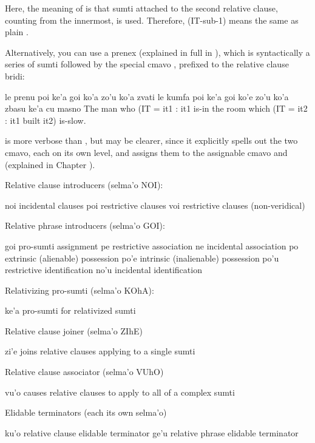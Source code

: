 Here, the meaning of  is that sumti attached to the
    second relative clause, counting from the innermost, is used.
    Therefore,  (IT-sub-1) means the same as plain
    . 

Alternatively, you can use a prenex (explained in full in ), which is syntactically a
    series of sumti followed by the special cmavo ,
    prefixed to the relative clause bridi:
\begin{example}
le prenu poi ke'a goi ko'a zo'u ko'a zvati le kumfa\n
\T	poi ke'a goi ko'e zo'u ko'a zbasu ke'a cu masno\n
The man who (IT = it1 : it1 is-in the room\n
\T	which (IT = it2 : it1 built it2) is-slow.
\end{example}

 is more verbose than , but may be clearer, since it
    explicitly spells out the two  cmavo, each on its own
    level, and assigns them to the assignable cmavo  and
     (explained in Chapter ).



Relative clause introducers (selma'o NOI):

   noi     incidental clauses
    poi     restrictive clauses
    voi     restrictive clauses (non-veridical)

Relative phrase introducers (selma'o GOI):

   goi     pro-sumti assignment
    pe      restrictive association
    ne      incidental association
    po      extrinsic (alienable) possession
    po'e        intrinsic (inalienable) possession
    po'u        restrictive identification
    no'u        incidental identification

Relativizing pro-sumti (selma'o KOhA):

   ke'a        pro-sumti for relativized sumti

Relative clause joiner (selma'o ZIhE)

   zi'e        joins relative clauses applying to
                a single sumti

Relative clause associator (selma'o VUhO)

   vu'o        causes relative clauses to apply to
                all of a complex sumti

Elidable terminators (each its own selma'o)

   ku'o        relative clause elidable terminator
    ge'u        relative phrase elidable terminator
